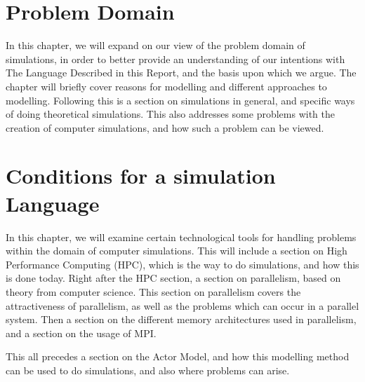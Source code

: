 \chapter{Problem Domain}\label{part:analysis}

In this chapter, we will expand on our view of the problem domain of simulations, in order to better provide an understanding of our intentions with The Language Described in this Report, and the basis upon which we argue. The chapter will briefly cover reasons for modelling and different approaches to modelling. Following this is a section on simulations in general, and specific ways of doing theoretical simulations. This also addresses some problems with the creation of computer simulations, and how such a problem can be viewed.



\chapter{Conditions for a simulation Language}\label{part:analysis2}

In this chapter, we will examine certain technological tools for handling problems within the domain of computer simulations. This will include a section on High Performance Computing (HPC), which is the way to do simulations, and how this is done today. Right after the HPC section, a section on parallelism, based on theory from computer science. This section on parallelism covers the attractiveness of parallelism, as well as the problems which can occur in a parallel system. Then a section on the different memory architectures used in parallelism, and a section on the usage of MPI.

This all precedes a section on the Actor Model, and how this modelling method can be used to do simulations, and also where problems can arise.






